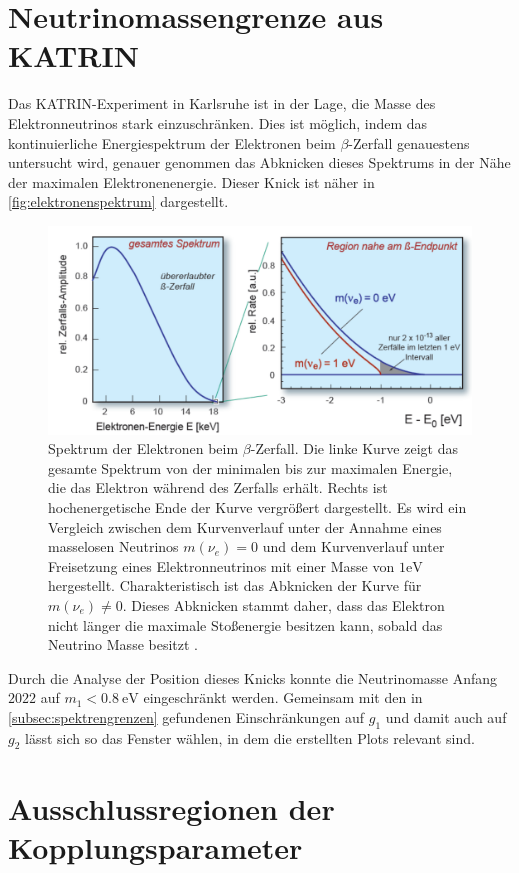 \section{Neutrinomassengrenze aus KATRIN}
\label{subsec:KATRIN}

Das KATRIN-Experiment in Karlsruhe ist in der Lage, die Masse des Elektronneutrinos stark einzuschränken.
Dies ist möglich, indem das kontinuierliche Energiespektrum der Elektronen beim $\beta$-Zerfall genauestens untersucht wird, genauer genommen das Abknicken dieses Spektrums in der Nähe der maximalen Elektronenenergie.
Dieser Knick ist näher in \autoref{fig:elektronenspektrum} dargestellt.
\begin{figure}[H]
    \centering
    \includegraphics[width=.5\textwidth]{figures/Elektronenspektrum.pdf}
    \caption{Spektrum der Elektronen beim $\beta$-Zerfall. Die linke Kurve zeigt das gesamte Spektrum von der minimalen bis zur maximalen Energie, die das Elektron während des Zerfalls erhält. Rechts
            ist hochenergetische Ende der Kurve vergrößert dargestellt. Es wird ein Vergleich zwischen dem Kurvenverlauf unter der Annahme eines masselosen Neutrinos $m(\nu_e) = 0$ und dem Kurvenverlauf unter Freisetzung
            eines Elektronneutrinos mit einer Masse von $1 \si{\eV}$ hergestellt. Charakteristisch ist das Abknicken der Kurve für $m(\nu_e) \neq 0$. Dieses Abknicken stammt daher, dass das Elektron nicht länger
            die maximale Stoßenergie besitzen kann, sobald das Neutrino Masse besitzt \cite{elektronenspektrum}.}
    \label{fig:elektronenspektrum}
\end{figure}
Durch die Analyse der Position dieses Knicks konnte die Neutrinomasse Anfang $2022$ auf $m_1 < \SI{0.8}{\eV}$ \cite{KATRINneutrinogrenze} eingeschränkt werden.
Gemeinsam mit den in \autoref{subsec:spektrengrenzen} gefundenen Einschränkungen auf $g_1$ und damit auch auf $g_2$ lässt sich so das Fenster wählen, in dem die erstellten Plots relevant sind.



\section{Ausschlussregionen der Kopplungsparameter}
\label{sec:kopplungen}

